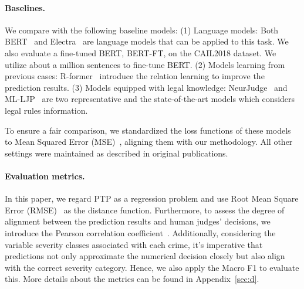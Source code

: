 \vspace{-0.5em}
\paragraph{Baselines.}
We compare with the following baseline models: (1) Language models: Both BERT~\cite{devlin-etal-2019-bert} and Electra~\cite{DBLP:conf/iclr/ClarkLLM20} are language models that can be applied to this task. We also evaluate a fine-tuned BERT, BERT-FT, on the CAIL2018 dataset. We utilize about a million sentences to fine-tune BERT. (2) Models learning from previous cases: R-former~\cite{Rformer} introduce the relation learning to improve the prediction results. (3) Models equipped with legal knowledge: NeurJudge~\cite{neurjudge} and ML-LJP~\cite{ML-LJP} are two representative and the state-of-the-art models which considers legal rules information.

To ensure a fair comparison, we standardized the loss functions of these models to Mean Squared Error (MSE)~\cite{chicco2021coefficient}, aligning them with our methodology. All other settings were maintained as described in original publications.

\vspace{-0.5em}
\paragraph{Evaluation metrics.}
In this paper, we regard PTP as a regression problem and use Root Mean Square Error (RMSE)~\cite{chai2014root} as the distance function. Furthermore, to assess the degree of alignment between the prediction results and human judges' decisions, we introduce the Pearson correlation coefficient~\cite{cohen2009pearson}. Additionally, considering the variable severity classes associated with each crime, it's imperative that predictions not only approximate the numerical decision closely but also align with the correct severity category. Hence, we also apply the Macro F1 to evaluate this. More details about the metrics can be found in Appendix~\ref{sec:d}.


